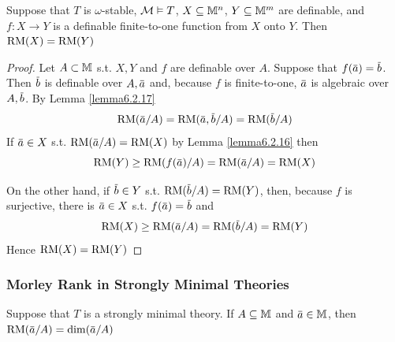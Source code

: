\documentclass[11pt]{article}
\begin{document}
\begin{corollary}[]
Suppose that \(T\) is \(\omega\)-stable, \(\mathcal{M}\vDash T\), \(X\subseteq\mathbb{M}^n\), \(Y\subseteq\mathbb{M}^m\) are definable, and \(f:X\to Y\) is a
definable finite-to-one function from \(X\) onto \(Y\). Then \(\operatorname{RM}(X)=\operatorname{RM}(Y)\)
\end{corollary}

\begin{proof}
Let \(A\subset\mathbb{M}\) s.t. \(X,Y\) and \(f\) are definable over \(A\). Suppose that \(f(\bara)=\barb\).
Then \(\barb\) is definable over \(A,\bara\) and, because \(f\) is finite-to-one, \(\bara\) is
algebraic over \(A,\barb\). By Lemma \ref{lemma6.2.17}
\begin{equation*}
\RM(\bara/A)=\RM(\bara,\barb/A)=\RM(\barb/A)
\end{equation*}
If \(\bara\in X\) s.t. \(\RM(\bara/A)=\RM(X)\) by Lemma \ref{lemma6.2.16} then
\begin{equation*}
\RM(Y)\ge\RM(f(\bara)/A)=\RM(\bara/A)=\RM(X)
\end{equation*}

On the other hand, if \(\barb\in Y\) s.t. \(\RM(\barb/A)=\RM(Y)\), then, because \(f\) is
surjective, there is \(\bara\in X\) s.t. \(f(\bara)=\barb\) and
\begin{equation*}
\RM(X)\ge\RM(\bara/A)=\RM(\barb/A)=\RM(Y)
\end{equation*}
Hence \(\operatorname{RM}(X)=\operatorname{RM}(Y)\)
\end{proof}
\subsubsection{Morley Rank in Strongly Minimal Theories}
\label{sec:org4d14cfa}
\begin{theorem}[]
Suppose that \(T\) is a strongly minimal theory. If \(A\subseteq\mathbb{M}\) and \(\bara\in\M\), then \(\RM(\bara/A)=\dim(\bara/A)\)
\end{theorem}
\end{document}
